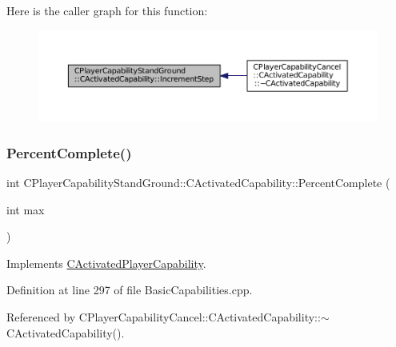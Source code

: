 Here is the caller graph for this function\+:\nopagebreak
\begin{figure}[H]
\begin{center}
\leavevmode
\includegraphics[width=350pt]{classCPlayerCapabilityStandGround_1_1CActivatedCapability_ab4061171835e4c1008176e5765ded595_icgraph}
\end{center}
\end{figure}
\hypertarget{classCPlayerCapabilityStandGround_1_1CActivatedCapability_aa9bf1824e755460b699d81f866f2aadc}{}\label{classCPlayerCapabilityStandGround_1_1CActivatedCapability_aa9bf1824e755460b699d81f866f2aadc} 
\subsubsection{\texorpdfstring{Percent\+Complete()}{PercentComplete()}}
{\footnotesize\ttfamily int C\+Player\+Capability\+Stand\+Ground\+::\+C\+Activated\+Capability\+::\+Percent\+Complete (\begin{DoxyParamCaption}\item[{int}]{max }\end{DoxyParamCaption})\hspace{0.3cm}{\ttfamily [virtual]}}



Implements \hyperlink{classCActivatedPlayerCapability_a405dc6076058006a4f801727de4cfe4d}{C\+Activated\+Player\+Capability}.



Definition at line 297 of file Basic\+Capabilities.\+cpp.



Referenced by C\+Player\+Capability\+Cancel\+::\+C\+Activated\+Capability\+::$\sim$\+C\+Activated\+Capability().


